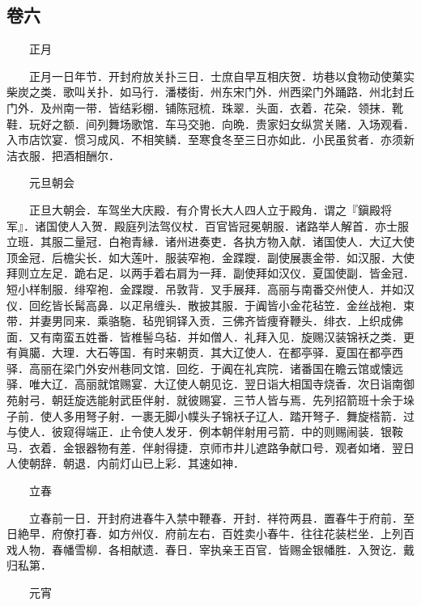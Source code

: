\hypertarget{ux5377ux516d}{%
\subsection{卷六}\label{ux5377ux516d}}

　　正月

　　正月一日年节．开封府放关扑三日．士庶自早互相庆贺．坊巷以食物动使菓实柴炭之类．歌叫关扑．如马行．潘楼街．州东宋门外．州西梁门外踊路．州北封丘门外．及州南一带．皆结彩棚．铺陈冠梳．珠翠．头面．衣着．花朶．领抹．靴鞋．玩好之额．间列舞场歌馆．车马交驰．向晩．贵家妇女纵赏关赌．入场观看．入市店饮宴．惯习成风．不相笑鳞．至寒食冬至三日亦如此．小民虽贫者．亦须新洁衣服．把酒相酬尔．

　　元旦朝会

　　正旦大朝会．车驾坐大庆殿．有介冑长大人四人立于殿角．谓之『鎭殿将军』．诸国使人入贺．殿庭列法驾仪杖．百官皆冠冕朝服．诸路举人解首．亦士服立班．其服二量冠．白袍青縁．诸州进奏吏．各执方物入献．诸国使人．大辽大使顶金冠．后檐尖长．如大莲叶．服装窄袍．金蹀躞．副使展裹金带．如汉服．大使拜则立左足．跪右足．以两手着右肩为一拜．副使拜如汉仪．夏国使副．皆金冠．短小样制服．绯窄袍．金蹀躞．吊敦背．叉手展拜．高丽与南番交州使人．并如汉仪．回纥皆长髯高鼻．以疋帛缠头．散披其服．于阗皆小金花毡笠．金丝战袍．束带．并妻男同来．乘骆駞．毡兜铜铎入贡．三佛齐皆痩脊鞭头．绯衣．上织成佛面．又有南蛮五姓番．皆椎髻乌毡．并如僧人．礼拜入见．旋赐汉装锦袄之类．更有眞臈．大理．大石等国．有时来朝贡．其大辽使人．在都亭驿．夏国在都亭西驿．高丽在梁门外安州巷同文馆．回纥．于阗在礼宾院．诸番国在瞻云馆或懐远驿．唯大辽．高丽就馆赐宴．大辽使人朝见讫．翌日诣大相国寺烧香．次日诣南御苑射弓．朝廷旋选能射武臣伴射．就彼赐宴．三节人皆与焉．先列招箭班十余于垛子前．使人多用弩子射．一裹无脚小幞头子锦袄子辽人．踏开弩子．舞旋榙箭．过与使人．彼窥得端正．止令使人发牙．例本朝伴射用弓箭．中的则赐闹装．银鞍马．衣着．金银器物有差．伴射得捷．京师市井儿遮路争献口号．观者如堵．翌日人使朝辞．朝退．内前灯山已上彩．其速如神．

　　立春

　　立春前一日．开封府进春牛入禁中鞭春．开封．祥符两县．置春牛于府前．至日絶早．府僚打春．如方州仪．府前左右．百姓卖小春牛．往往花装栏坐．上列百戏人物．春幡雪柳．各相献遗．春日．宰执亲王百官．皆赐金银幡胜．入贺讫．戴归私第．

　　元宵

